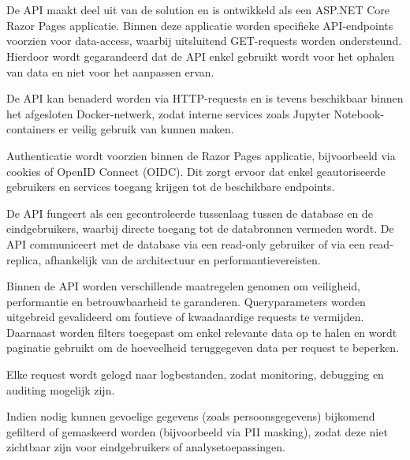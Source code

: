 \section{}
\label{ch:architecture-api}

De API maakt deel uit van de solution en is ontwikkeld als een ASP.NET Core Razor Pages applicatie. Binnen deze applicatie worden specifieke API-endpoints voorzien voor data-access, waarbij uitsluitend GET-requests worden ondersteund. Hierdoor wordt gegarandeerd dat de API enkel gebruikt wordt voor het ophalen van data en niet voor het aanpassen ervan.

De API kan benaderd worden via HTTP-requests en is tevens beschikbaar binnen het afgesloten Docker-netwerk, zodat interne services zoals Jupyter Notebook-containers er veilig gebruik van kunnen maken.

Authenticatie wordt voorzien binnen de Razor Pages applicatie, bijvoorbeeld via cookies of OpenID Connect (OIDC). Dit zorgt ervoor dat enkel geautoriseerde gebruikers en services toegang krijgen tot de beschikbare endpoints.

De API fungeert als een gecontroleerde tussenlaag tussen de database en de eindgebruikers, waarbij directe toegang tot de databronnen vermeden wordt. De API communiceert met de database via een read-only gebruiker of via een read-replica, afhankelijk van de architectuur en performantievereisten.

Binnen de API worden verschillende maatregelen genomen om veiligheid, performantie en betrouwbaarheid te garanderen. Queryparameters worden uitgebreid gevalideerd om foutieve of kwaadaardige requests te vermijden. Daarnaast worden filters toegepast om enkel relevante data op te halen en wordt paginatie gebruikt om de hoeveelheid teruggegeven data per request te beperken.

Elke request wordt gelogd naar logbestanden, zodat monitoring, debugging en auditing mogelijk zijn.

Indien nodig kunnen gevoelige gegevens (zoals persoonsgegevens) bijkomend gefilterd of gemaskeerd worden (bijvoorbeeld via PII masking), zodat deze niet zichtbaar zijn voor eindgebruikers of analysetoepassingen.
